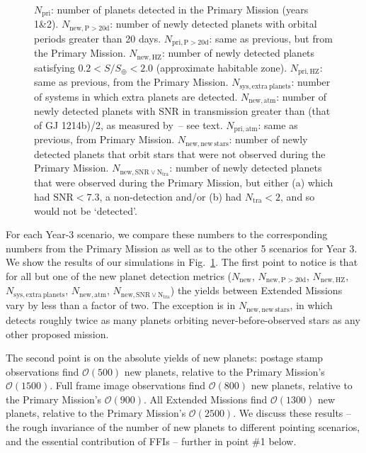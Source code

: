 \begin{figure}[!t]
{	$N_\mathrm{pri}$: number of planets detected in the Primary Mission (years 1\&2).
	$N_\mathrm{new,P>20d}$: number of newly detected planets with orbital periods greater than 20 days.
	$N_\mathrm{pri,P>20d}$: same as previous, but from the Primary Mission.
	$N_\mathrm{new,HZ}$: number of newly detected planets satisfying $0.2<S/S_\oplus<2.0$ (approximate habitable zone).
	$N_\mathrm{pri,HZ}$: same as previous, from the Primary Mission.
	$N_\mathrm{sys,extra\ planets}$: number of systems in which extra planets are detected.
	$N_\mathrm{new,atm}$: number of newly detected planets with SNR in transmission greater than (that of GJ 1214b)/2, as measured by \jwst\,-- see text.
	$N_\mathrm{pri,atm}$: same as previous, from Primary Mission.
	$N_\mathrm{new,new\ stars}$: number of newly detected planets that orbit stars that were not observed during the Primary Mission.
	$N_\mathrm{new,SNR\lor N_{tra}}$: number of newly detected planets that were observed during the Primary Mission, but either (a) which had $\mathrm{SNR}<7.3$, a non-detection and/or (b) had $N_\mathrm{tra}<2$, and so would not be `detected'.}
	\label{fig:yield_results}
\end{figure}

For each Year-3 scenario, we compare these numbers to the
corresponding numbers from the Primary Mission as well as to the other
5 scenarios for Year 3. We show the results of our simulations in
Fig.~\ref{fig:yield_results}.  The first point to notice is that for
all but one of the new planet detection metrics ($N_\mathrm{new}$,
$N_\mathrm{new,P>20d}$, $N_\mathrm{new,HZ}$,
$N_\mathrm{sys,extra\ planets}$, $N_\mathrm{new,atm}$,
$N_\mathrm{new,SNR\lor N_{tra}}$) the yields between Extended Missions
vary by less than a factor of two.  The exception is in
$N_\mathrm{new,new\ stars}$, in which \elong\:detects roughly twice as
many planets orbiting never-before-observed stars as any other
proposed mission.

The second point is on the absolute yields of new planets: postage stamp observations find $\mathcal{O}(500)$ new planets, relative to the Primary Mission's $\mathcal{O}(1500)$.
Full frame image observations find $\mathcal{O}(800)$ new planets, relative to the Primary Mission's $\mathcal{O}(900)$.
All Extended Missions find $\mathcal{O}(1300)$ new planets, relative to the Primary Mission's $\mathcal{O}(2500)$.
We discuss these results -- the rough invariance of the number of new planets to different pointing scenarios, and the essential contribution of FFIs -- further in point \#1 below.

